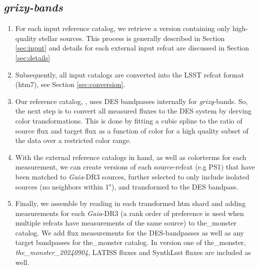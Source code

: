\subsection{\textit{grizy-bands}}
\begin{enumerate}
    \item For each input reference catalog, we retrieve a version containing only high-quality stellar sources. This process is generally described in Section \ref{sec:input} and details for each external input refcat are discussed in Section \ref{sec:details}
    \item Subsequently, all input catalogs are converted into the LSST refcat format (htm7), see Section \ref{sec:conversion}.
    \item Our reference catalog, \monster, uses DES bandpasses internally for \textit{grizy}-bands. So, the next step is to convert all measured fluxes to the DES system by derving color transformations.
    This is done by fitting a cubic spline to the ratio of source flux and target flux as a function of color for a high quality subset of the data over a restricted color range.
    \item With the external reference catalogs in hand, as well as colorterms for each measurement, we can create versions of each source-refcat (e.g PS1) that have been matched to \textit{Gaia}-DR3 sources, further selected to only include isolated sources (no neighbors within 1"), and transformed to the DES bandpass.
    \item Finally, we assemble \monster by reading in each transformed htm shard and adding measurements for each \emph{Gaia}-DR3 (a rank order of preference is used when multiple refcats have measurements of the same source) to the\_monster catalog. 
    We add flux measurements for the DES-bandpasses as well as any target bandpasses for the\_monster catalog. In version one of the\_monster, \textit{the\_monster\_20240904}, LATISS fluxes and SynthLsst fluxes are included as well.
\end{enumerate}

